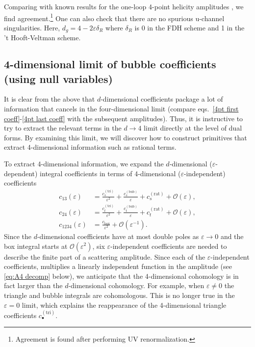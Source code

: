 \documentclass[11pt]{article}
\newcommand{\nn}{\nonumber}
\renewcommand{\O}{\mathcal{O}}
\newcommand{\vep}{\varepsilon}
\begin{document}
Comparing with known results for the one-loop 4-point helicity amplitudes \cite{Bern:1991aq}, we find agreement.\footnote{Agreement is found after performing UV renormalization.} 
One can also check that there are no spurious u-channel singularities. 
Here, $d_g = 4-2\vep \delta_R$ where $\delta_R$ is 0 in the FDH scheme and 1 in the 't Hooft-Veltman scheme. 



\subsection{4-dimensional limit of bubble coefficients (using null variables) 
\label{sec:4dbubble}}

It is clear from the above that $d$-dimensional coefficients package a lot of information that
cancels in the four-dimensional limit (compare eqs.~\eqref{4pt first coeff}-\eqref{4pt last coeff} with the subsequent amplitudes).
Thus, it is instructive to try to extract the relevant terms in the $d\to 4$ limit directly at the level of dual forms.
By examining this limit, we will discover how to construct primitives that extract 4-dimensional information such as rational terms. 


To extract 4-dimensional information, we expand the $d$-dimensional ($\vep$-dependent) integral coefficients in terms of 4-dimensional ($\vep$-independent) coefficients
\begin{align}
	c_{13} (\vep)
	&= \frac{ c_{s}^{(\text{tri})} }{\vep^2}
		+ \frac{ c_{s}^{(\text{bub})} }{\vep}	
		+ c_{s}^{(\text{rat})}
		+ \O(\vep),
	\nn\\
	c_{24} (\vep)
	&= \frac{ c_{t}^{(\text{tri})} }{\vep^2}
		+ \frac{ c_{t}^{(\text{bub})} }{\vep}	
		+ c_{t}^{(\text{rat})}
		+ \O(\vep),
	\nn\\
	c_{1234}(\vep) &= \frac{c_\text{box}}{\vep^2} + \O(\vep^{-1}).
\end{align}
Since the $d$-dimensional coefficients have at most double poles as $\vep\to0$ and the box integral starts at $\mathcal{O}(\vep^2)$, six $\vep$-independent coefficients are needed to describe the finite part of a scattering amplitude. Since each of the $\vep$-independent coefficients, multiplies a linearly independent function in the amplitude (see \eqref{eq:A4 decomp} below), we anticipate that the 4-dimensional cohomology is in fact larger than the $d$-dimensional cohomology. For example, when $\vep\neq0$ the triangle and bubble integrals are cohomologous. This is no longer true in the $\vep=0$ limit, which explains the reappearance of the 4-dimensional triangle coefficients $c_\bullet^{(\text{tri})}$.
\end{document}
